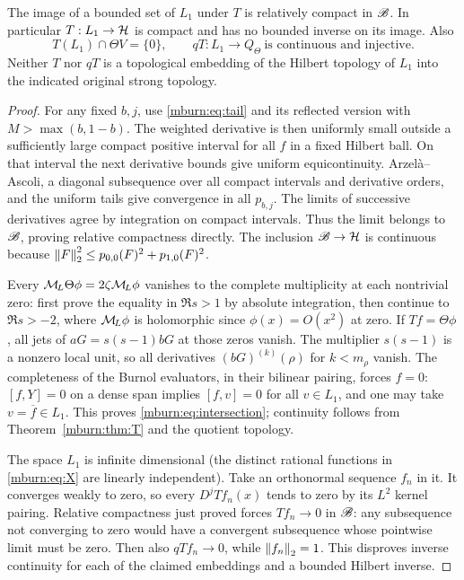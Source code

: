 \documentclass[11pt]{article}
\begin{document}
\begin{mburnproposition}
\label{mburn:prop:quotient}
The image of a bounded set of $L_1$ under $T$ is relatively
compact in $\mathscr B$. In particular $T:L_1\to\mathcal H$ is compact and
has no bounded inverse on its image. Also
\begin{equation}\label{mburn:eq:intersection}
 T(L_1)\cap\Theta V=\{0\},\qquad
 qT:L_1\longrightarrow Q_\Theta\ \text{is continuous and injective}.
\end{equation}
Neither $T$ nor $qT$ is a topological embedding of the Hilbert
topology of $L_1$ into the indicated original strong topology.
\end{mburnproposition}
\begin{proof}
For any fixed $b,j$, use \eqref{mburn:eq:tail} and its reflected version
with $M>\max(b,1-b)$. The weighted derivative is then uniformly
small outside a sufficiently large compact positive interval for
all $f$ in a fixed Hilbert ball. On that interval the next
derivative bounds give uniform equicontinuity. Arzel\`a--Ascoli,
a diagonal subsequence over all compact intervals and derivative
orders, and the uniform tails give convergence in all $p_{b,j}$.
The limits of successive derivatives agree by integration on
compact intervals. Thus the limit belongs to $\mathscr B$, proving
relative compactness directly. The inclusion $\mathscr B\to\mathcal H$ is
continuous because
$\left\lVert F\right\rVert_2^2\leq p_{0,0}(F)^2+p_{1,0}(F)^2$.

Every $\mathcal M_{\!L}\Theta\phi=2\zeta\mathcal M_{\!L}\phi$ vanishes to the complete
multiplicity at each nontrivial zero: first prove the equality in
$\Re s>1$ by absolute integration, then continue to $\Re s>-2$,
where $\mathcal M_{\!L}\phi$ is holomorphic since $\phi(x)=O(x^2)$ at zero.
If $Tf=\Theta\phi$, all jets of $aG=s(s-1)bG$ at those zeros
vanish. The multiplier $s(s-1)$ is a nonzero local unit, so all
derivatives $(bG)^{(k)}(\rho)$ for $k<m_\rho$ vanish. The
completeness of the Burnol evaluators, in their bilinear pairing,
forces $f=0$: $[f,Y]=0$ on a dense span implies $[f,v]=0$ for
all $v\in L_1$, and one may take $v=\overline f\in L_1$.
This proves \eqref{mburn:eq:intersection}; continuity follows from
Theorem~\ref{mburn:thm:T} and the quotient topology.

The space $L_1$ is infinite dimensional (the distinct rational
functions in \eqref{mburn:eq:X} are linearly independent). Take an
orthonormal sequence $f_n$ in it. It converges weakly to zero, so
every $D^jTf_n(x)$ tends to zero by its $L^2$ kernel pairing.
Relative compactness just proved forces $Tf_n\to0$ in $\mathscr B$:
any subsequence not converging to zero would have a convergent
subsequence whose pointwise limit must be zero. Then also
$qTf_n\to0$, while $\left\lVert f_n\right\rVert_2=1$. This disproves inverse
continuity for each of the claimed embeddings and a bounded
Hilbert inverse.
\end{proof}
\end{document}

